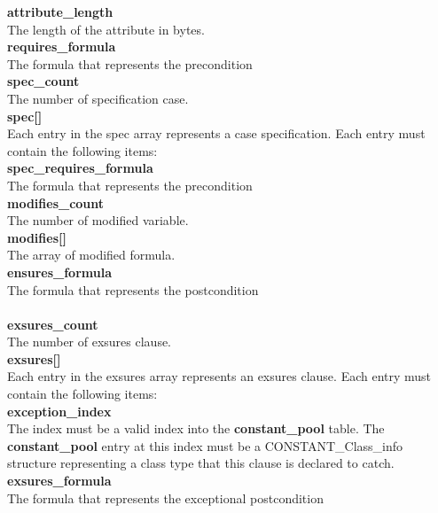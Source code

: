 \textbf{   attribute\_length}\\
   The length of the attribute in bytes.\\

\textbf{   requires\_formula} \\
   The formula that represents the precondition \\

\textbf{   spec\_count} \\
   The number of specification case.\\

\textbf{   spec[]} \\
   Each entry in the spec array represents a case specification. Each entry must contain the following items:\\

\textbf{   spec\_requires\_formula} \\
   The formula that represents the precondition\\

\textbf{   modifies\_count} \\
   The number of modified variable.\\

\textbf{   modifies[]} \\
   The array of modified formula.\\

\textbf{  ensures\_formula } \\
   The formula that represents the postcondition \\\\

\textbf{   exsures\_count} \\
   The number of exsures clause.\\

\textbf{   exsures[] } \\
   Each entry in the exsures array represents an exsures clause. Each entry must contain the following items:\\

\textbf{   exception\_index} \\
   The index must be a valid index into the \textbf{constant\_pool} table. The \textbf{constant\_pool} entry at this index must be a CONSTANT\_Class\_info structure representing a class type that this clause is declared to catch.\\

\textbf{  exsures\_formula } \\
   The formula that represents the exceptional postcondition \\

